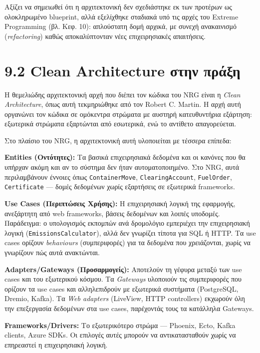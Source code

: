 Αξίζει να σημειωθεί ότι η αρχιτεκτονική δεν σχεδιάστηκε εκ των προτέρων
ως ολοκληρωμένο blueprint, αλλά εξελίχθηκε σταδιακά υπό τις αρχές του
Extreme Programming (βλ. Κεφ. 10): απλούστατη δομή αρχικά, με συνεχή
ανακαινισμό (\emph{refactoring}) καθώς αποκαλύπτονταν νέες
επιχειρησιακές απαιτήσεις.

\section{9.2 Clean Architecture στην
πράξη}\label{clean-architecture-ux3c3ux3c4ux3b7ux3bd-ux3c0ux3c1ux3acux3beux3b7}

Η θεμελιώδης αρχιτεκτονική αρχή που διέπει τον κώδικα του NRG είναι η
\emph{Clean Architecture}, όπως αυτή τεκμηριώθηκε από τον Robert C.
Martin. Η αρχή αυτή οργανώνει τον κώδικα σε ομόκεντρα στρώματα με
αυστηρή κατευθυντήρια εξάρτηση: εξωτερικά στρώματα εξαρτώνται από
εσωτερικά, ενώ το αντίθετο απαγορεύεται.

Στο πλαίσιο του NRG, η αρχιτεκτονική αυτή υλοποιείται με τέσσερα
επίπεδα:

\textbf{Entities (Οντότητες):} Τα βασικά επιχειρησιακά δεδομένα και οι
κανόνες που θα υπήρχαν ακόμη και αν το σύστημα δεν ήταν
αυτοματοποιημένο. Στο NRG, αυτά περιλαμβάνουν έννοιες όπως
\texttt{ContainerMove}, \texttt{ClearingAccount}, \texttt{FuelOrder},
\texttt{Certificate} --- δομές δεδομένων χωρίς εξαρτήσεις σε εξωτερικά
frameworks.

\textbf{Use Cases (Περιπτώσεις Χρήσης):} Η επιχειρησιακή λογική της
εφαρμογής, ανεξάρτητη από web frameworks, βάσεις δεδομένων και λοιπές
υποδομές. Παράδειγμα: ο υπολογισμός εκπομπών ανά δρομολόγιο εμπεριέχει
την επιχειρησιακή λογική (\texttt{EmissionsCalculator}), αλλά δεν
γνωρίζει τίποτα για SQL ή HTTP. Τα use cases ορίζουν \emph{behaviours}
(συμπεριφορές) για τα δεδομένα που χρειάζονται, χωρίς να γνωρίζουν πώς
αυτά ανακτώνται.

\textbf{Adapters/Gateways (Προσαρμογείς):} Αποτελούν τη γέφυρα μεταξύ
των use cases και του εξωτερικού κόσμου. Τα \emph{Gateways} υλοποιούν
τις συμπεριφορές που ορίζουν τα use cases και αλληλεπιδρούν με εξωτερικά
συστήματα (PostgreSQL, Dremio, Kafka). Τα \emph{Web adapters} (LiveView,
HTTP controllers) εκχωρούν όλη την επεξεργασία δεδομένων στα use cases,
παρέχοντάς τους τα κατάλληλα Gateways.

\textbf{Frameworks/Drivers:} Το εξωτερικότερο στρώμα --- Phoenix, Ecto,
Kafka clients, Azure SDKs. Οι επιλογές αυτές μπορούν να αντικατασταθούν
χωρίς να επηρεαστεί η επιχειρησιακή λογική.

